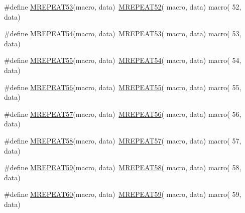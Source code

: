 \begin{DoxyCompactItemize}
\item 
\#define \mbox{\hyperlink{group__group__sam0__utils__mrepeat_ga89d961bc06d5e1e4f531ee43424c0e98}{M\+R\+E\+P\+E\+A\+T53}}(macro,  data)~\mbox{\hyperlink{group__group__sam0__utils__mrepeat_ga321d36cd49e5f6ca5dc7066e7913e634}{M\+R\+E\+P\+E\+A\+T52}}( macro, data)   macro( 52, data)
\item 
\#define \mbox{\hyperlink{group__group__sam0__utils__mrepeat_ga04d38cb9d863bba593db5c5533234b2b}{M\+R\+E\+P\+E\+A\+T54}}(macro,  data)~\mbox{\hyperlink{group__group__sam0__utils__mrepeat_ga89d961bc06d5e1e4f531ee43424c0e98}{M\+R\+E\+P\+E\+A\+T53}}( macro, data)   macro( 53, data)
\item 
\#define \mbox{\hyperlink{group__group__sam0__utils__mrepeat_ga43d357d7b292b560fb1a49f4778f56e8}{M\+R\+E\+P\+E\+A\+T55}}(macro,  data)~\mbox{\hyperlink{group__group__sam0__utils__mrepeat_ga04d38cb9d863bba593db5c5533234b2b}{M\+R\+E\+P\+E\+A\+T54}}( macro, data)   macro( 54, data)
\item 
\#define \mbox{\hyperlink{group__group__sam0__utils__mrepeat_ga1f3c1ef60a18b07755f237d441952d34}{M\+R\+E\+P\+E\+A\+T56}}(macro,  data)~\mbox{\hyperlink{group__group__sam0__utils__mrepeat_ga43d357d7b292b560fb1a49f4778f56e8}{M\+R\+E\+P\+E\+A\+T55}}( macro, data)   macro( 55, data)
\item 
\#define \mbox{\hyperlink{group__group__sam0__utils__mrepeat_ga6c79341e638712e4f76cfa03b92acba3}{M\+R\+E\+P\+E\+A\+T57}}(macro,  data)~\mbox{\hyperlink{group__group__sam0__utils__mrepeat_ga1f3c1ef60a18b07755f237d441952d34}{M\+R\+E\+P\+E\+A\+T56}}( macro, data)   macro( 56, data)
\item 
\#define \mbox{\hyperlink{group__group__sam0__utils__mrepeat_ga36b3ee8ed153de1e332867165d8bd129}{M\+R\+E\+P\+E\+A\+T58}}(macro,  data)~\mbox{\hyperlink{group__group__sam0__utils__mrepeat_ga6c79341e638712e4f76cfa03b92acba3}{M\+R\+E\+P\+E\+A\+T57}}( macro, data)   macro( 57, data)
\item 
\#define \mbox{\hyperlink{group__group__sam0__utils__mrepeat_ga0cdad412352b83b391e04d59bc7302b5}{M\+R\+E\+P\+E\+A\+T59}}(macro,  data)~\mbox{\hyperlink{group__group__sam0__utils__mrepeat_ga36b3ee8ed153de1e332867165d8bd129}{M\+R\+E\+P\+E\+A\+T58}}( macro, data)   macro( 58, data)
\item 
\#define \mbox{\hyperlink{group__group__sam0__utils__mrepeat_ga4fd4e49134a22edba74f048333b8a4e6}{M\+R\+E\+P\+E\+A\+T60}}(macro,  data)~\mbox{\hyperlink{group__group__sam0__utils__mrepeat_ga0cdad412352b83b391e04d59bc7302b5}{M\+R\+E\+P\+E\+A\+T59}}( macro, data)   macro( 59, data)

\end{DoxyCompactItemize}

